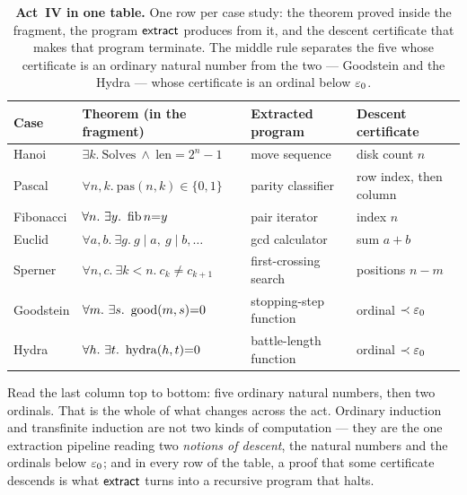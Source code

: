 \documentclass[11pt]{article}
\begin{document}
\begin{table}[h]
\centering
\renewcommand{\arraystretch}{1.32}
\small
\begin{tabular}{@{}llll@{}}
\toprule
\textbf{Case} & \textbf{Theorem (in the fragment)} & \textbf{Extracted program} & \textbf{Descent certificate} \\
\midrule
Hanoi     & $\exists k.\ \mathrm{Solves}\ \wedge\ \mathrm{len}{=}2^n{-}1$ & move sequence          & disk count $n$ \\
Pascal    & $\forall n,k.\ \mathrm{pas}(n,k)\in\{0,1\}$                   & parity classifier      & row index, then column \\
Fibonacci & $\forall n.\ \exists y.\ \fib n{=}y$                          & pair iterator          & index $n$ \\
Euclid    & $\forall a,b.\ \exists g.\ g\mid a,\ g\mid b,\dots$           & gcd calculator         & sum $a+b$ \\
Sperner   & $\forall n,c.\ \exists k{<}n.\ c_k{\neq}c_{k+1}$              & first-crossing search  & positions $n-m$ \\
\midrule
Goodstein & $\forall m.\ \exists s.\ \good(m,s){=}0$                      & stopping-step function & ordinal $\prec\varepsilon_0$ \\
Hydra     & $\forall h.\ \exists t.\ \hydra(h,t){=}0$                     & battle-length function & ordinal $\prec\varepsilon_0$ \\
\bottomrule
\end{tabular}
\caption{\textbf{Act~IV in one table.} One row per case study: the theorem proved
inside the fragment, the program $\mathsf{extract}$ produces from it, and the descent
certificate that makes that program terminate. The middle rule separates the
five whose certificate is an ordinary natural number from the two --- Goodstein
and the Hydra --- whose certificate is an ordinal below $\varepsilon_0$.}
\label{tab:descent}
\end{table}

Read the last column top to bottom: five ordinary natural numbers, then two
ordinals. That is the whole of what changes across the act. Ordinary induction
and transfinite induction are not two kinds of computation --- they are the one
extraction pipeline reading two \emph{notions of descent}, the natural numbers
and the ordinals below $\varepsilon_0$; and in every row of the table, a proof that some
certificate descends is what $\mathsf{extract}$ turns into a recursive program that
halts.

\end{document}
